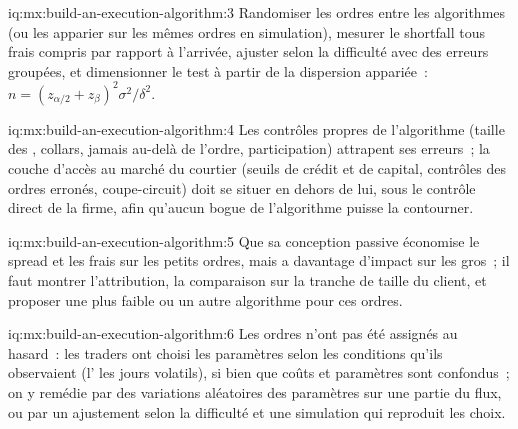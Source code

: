 \begin{solution}{iq:mx:build-an-execution-algorithm:3}
Randomiser les ordres entre les algorithmes (ou les apparier sur les mêmes ordres en simulation), mesurer le shortfall tous frais compris par rapport à l'arrivée, ajuster
selon la difficulté avec des erreurs groupées, et dimensionner le test à partir de la dispersion appariée~: $n=(z_{\alpha/2}+z_\beta)^2\sigma^2/\delta^2$.
\end{solution}

\begin{solution}{iq:mx:build-an-execution-algorithm:4}
Les contrôles propres de l'algorithme (taille des , collars, jamais au-delà de l'ordre, participation) attrapent ses erreurs~; la couche d'accès au marché du courtier
(seuils de crédit et de capital, contrôles des ordres erronés, coupe-circuit) doit se situer en dehors de lui, sous le contrôle direct de la firme, afin qu'aucun bogue de l'algorithme
puisse la contourner.
\end{solution}

\begin{solution}{iq:mx:build-an-execution-algorithm:5}
Que sa conception passive économise le spread et les frais sur les petits ordres, mais a davantage d'impact sur les gros~; il faut montrer l'attribution, la comparaison sur la
tranche de taille du client, et proposer une  plus faible ou un autre algorithme pour ces ordres.
\end{solution}

\begin{solution}{iq:mx:build-an-execution-algorithm:6}
Les ordres n'ont pas été assignés au hasard~: les traders ont choisi les paramètres selon les conditions qu'ils observaient (l' les jours volatils), si bien que coûts et paramètres sont
confondus~; on y remédie par des variations aléatoires des paramètres sur une partie du flux, ou par un ajustement selon la difficulté et une simulation qui reproduit les choix.
\end{solution}

